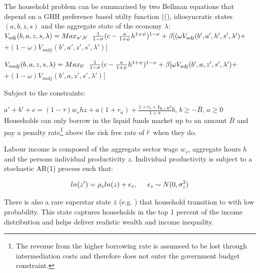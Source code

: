\documentclass[12pt]{article}
\begin{document}
The household problem can be summarised by two Bellman equations that depend on a GHH preference based utilty function ((\cite{greenwood1988investment}), idiosyncratic states $(a,b,z,s)$ and the aggregate state of the economy $\lambda$:
\\

$    V_{adj}(b,a,z,s,\lambda)=Max_{a',b'} \hspace{2mm} \frac{1}{1-\sigma}(c-\frac{\kappa}{1+\psi}h^{1+\psi})^{1-\sigma} + \beta [ (\omega V_{adj}(b',a',h',s',\lambda')+ $ \\      $+ (1-\omega) V_{nadj}(b',a',z',s',\lambda')]$
\begin{equation}
\label{eq:Bellman1}
\end{equation}

$    V_{nadj}(b,a,z,s,\lambda)=Max_{b'} \hspace{2mm} \frac{1}{1-\sigma}(c-\frac{\kappa}{1+\psi}h^{1+\psi})^{1-\sigma} + \beta [ \omega V_{adj}(b',a,z',s',\lambda')+ $ \\      $+ (1-\omega) V_{nadj}(b',a,z',s',\lambda')]$
\begin{equation}
\label{eq:Bellman2}
\end{equation}

Subject to the constraints:

$    a'+b'+c=(1-\tau)w_{s}hz+a(1+r_{a})+\frac{1+r_{b}+\mathbf{1_{b<0}} \bar{r}}{1+\pi}b$, \hspace{2mm} $b \ge -\bar{B}$, \hspace{2mm} $a \ge 0$ \\

Households can only borrow in the liquid funds market up to an amount $\bar{B}$ and pay a penalty rate\footnote{ The revenue from the higher borrowing rate is assumeed to be lost through intermediation costs and therefore does not enter the government budget constraint. } above the risk free rate of $\Bar{r}$ when they do.

Labour income is composed of the aggregate sector wage $w_{s}$, aggregate hours $h$ and the persons individual productivity $z$. Individual productivity is subject to a stochastic AR(1) process such that:

\begin{equation}
    ln(z')=\rho_{z}ln(z)+\epsilon_{z}, \hspace{5mm} \epsilon_{z} \sim N(0,\sigma_{z}^2) 
\end{equation}

There is also a rare superstar state $\bar{z}$ (e.g. \cite{castaneda2003accounting}) that household transition to with low probability. This state captures households in the top 1 percent of the income distribution and helps deliver realistic wealth and income inequality. \\
\end{document}
